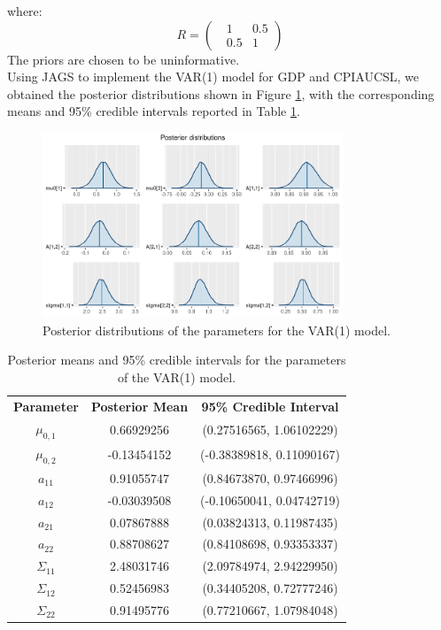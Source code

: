where: 
\begin{equation}
    R = 
    \begin{pmatrix}
        \ \ \ 1 & 0.5 \\
        \ \ \ 0.5 & 1
    \end{pmatrix}
\end{equation}
The priors are chosen to be uninformative. \\
Using JAGS to implement the VAR(1) model for GDP and CPIAUCSL, we obtained the posterior distributions shown in Figure \ref{fig:VAR1_posteriors}, with the corresponding means and 95\% credible intervals reported in Table \ref{tab:VAR1_posteriors}. \\
\begin{figure}[H]
    \centering
    \includegraphics[width=0.8\textwidth]{images/6-VAR/posteriors.png}
    \caption{Posterior distributions of the parameters for the VAR(1) model.}
    \label{fig:VAR1_posteriors}
\end{figure}
\begin{table}[H]
    \centering
    \begin{tabular}{c|c|c}
        \textbf{Parameter } & \textbf{Posterior Mean } & \textbf{95\% Credible Interval } \\
        \cline{1-3}
        $\mu_{0,1}$     &  0.66929256 &  (0.27516565, 1.06102229) \\
        $\mu_{0,2}$     & -0.13454152 &  (-0.38389818, 0.11090167) \\
        $a_{11}$     &  0.91055747 &  (0.84673870, 0.97466996) \\
        $a_{12}$     & -0.03039508 &  (-0.10650041, 0.04742719) \\
        $a_{21}$     &  0.07867888 &  (0.03824313, 0.11987435) \\
        $a_{22}$     &  0.88708627 &  (0.84108698, 0.93353337) \\
        $\Sigma_{11}$ &  2.48031746 &  (2.09784974, 2.94229950) \\
        $\Sigma_{12}$ &  0.52456983 &  (0.34405208, 0.72777246) \\
        $\Sigma_{22}$ &  0.91495776 &  (0.77210667, 1.07984048) \\
    \end{tabular}
    \caption{Posterior means and 95\% credible intervals for the parameters of the VAR(1) model.}
    \label{tab:VAR1_posteriors}
\end{table}
